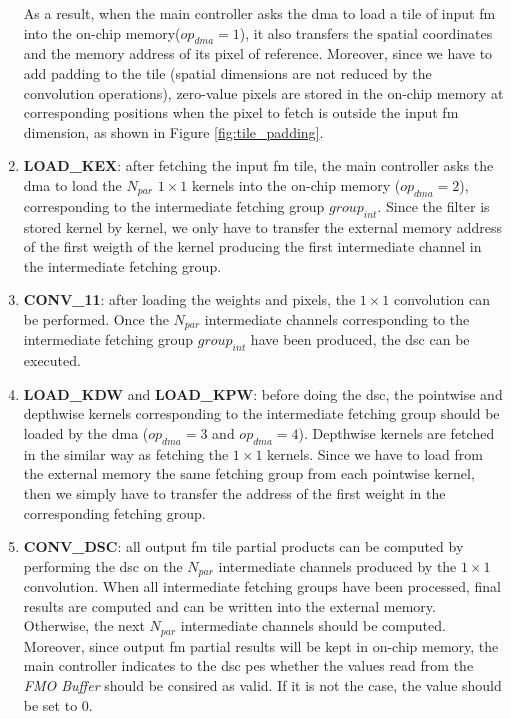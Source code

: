 \begin{enumerate}
    As a result, when the main controller asks the \acrshort{dma} to load a tile of input \acrshort{fm} into the on-chip memory($op_{dma} = 1$), it also transfers the spatial coordinates and the memory address of its pixel of reference. Moreover, since we have to add padding to the tile (spatial dimensions are not reduced by the convolution operations), zero-value pixels are stored in the on-chip memory at corresponding positions when the pixel to fetch is outside the input \acrshort{fm} dimension, as shown in Figure \ref{fig:tile_padding}.
    \item \textbf{LOAD\_KEX}: after fetching the input \acrshort{fm} tile, the main controller asks the \acrshort{dma} to load the $N_{par}$ $1 \times 1$ kernels into the on-chip memory ($op_{dma} = 2$), corresponding to the intermediate fetching group $group_{int}$. Since the filter is stored kernel by kernel, we only have to transfer the external memory address of the first weigth of the kernel producing the first intermediate channel in the intermediate fetching group.
    \item \textbf{CONV\_11}: after loading the weights and pixels, the $1 \times 1$ convolution can be performed. Once the $N_{par}$ intermediate channels corresponding to the intermediate fetching group $group_{int}$ have been produced, the \acrshort{dsc} can be executed.
    \item \textbf{LOAD\_KDW} and \textbf{LOAD\_KPW}: before doing the \acrshort{dsc}, the pointwise and depthwise kernels corresponding to the intermediate fetching group should be loaded by the \acrshort{dma} ($op_{dma} = 3$ and $op_{dma} = 4$). Depthwise kernels are fetched in the similar way as fetching the $1 \times 1$ kernels. Since we have to load from the external memory the same fetching group from each pointwise kernel, then we simply have to transfer the address of the first weight in the corresponding fetching group. 
    \item \textbf{CONV\_DSC}: all output \acrshort{fm} tile partial products can be computed by performing the \acrshort{dsc} on the $N_{par}$ intermediate channels produced by the $1 \times 1 $ convolution. When all intermediate fetching groups have been processed, final results are computed and can be written into the external memory. Otherwise, the next $N_{par}$ intermediate channels should be computed. Moreover, since output \acrshort{fm} partial results will be kept in on-chip memory, the main controller indicates to the \acrshort{dsc} \acrshort{pe}s whether the values read from the \textit{FMO Buffer} should be consired as valid. If it is not the case, the value should be set to 0.

\end{enumerate}
